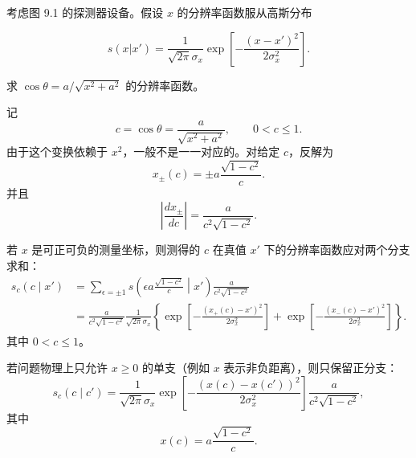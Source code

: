 ﻿





\begin{question}
考虑图 9.1 的探测器设备。假设 \(x\) 的分辨率函数服从高斯分布

\[
s(x|x')=\frac{1}{\sqrt{2\pi}\sigma_x}\exp\left[-\frac{(x-x')^2}{2\sigma_x^2}\right].
\]

求 \(\cos\theta=a/\sqrt{x^2+a^2}\) 的分辨率函数。
\begin{solution}
记
\[
c=\cos\theta=\frac{a}{\sqrt{x^2+a^2}},
\qquad 0<c\le1.
\]
由于这个变换依赖于 \(x^2\)，一般不是一一对应的。对给定 \(c\)，反解为
\[
x_\pm(c)=\pm a\frac{\sqrt{1-c^2}}{c}.
\]
并且
\[
\left|\frac{dx_\pm}{dc}\right|
=\frac{a}{c^2\sqrt{1-c^2}}.
\]

若 \(x\) 是可正可负的测量坐标，则测得的 \(c\) 在真值 \(x'\) 下的分辨率函数应对两个分支求和：
\[
\begin{split}
s_c(c\mid x')
&=\sum_{\epsilon=\pm1}
 s\left(\epsilon a\frac{\sqrt{1-c^2}}{c}\middle|x'\right)
 \frac{a}{c^2\sqrt{1-c^2}}\\
&=\frac{a}{c^2\sqrt{1-c^2}}
\frac{1}{\sqrt{2\pi}\sigma_x}
\left\{
\exp\left[-\frac{(x_+(c)-x')^2}{2\sigma_x^2}\right]
+
\exp\left[-\frac{(x_-(c)-x')^2}{2\sigma_x^2}\right]
\right\}.
\end{split}
\]
其中 \(0<c\le1\)。

若问题物理上只允许 \(x\ge0\) 的单支（例如 \(x\) 表示非负距离），则只保留正分支：
\[
s_c(c\mid c')=
\frac{1}{\sqrt{2\pi}\sigma_x}
\exp\left[-\frac{(x(c)-x(c'))^2}{2\sigma_x^2}\right]
\frac{a}{c^2\sqrt{1-c^2}},
\]
其中
\[
x(c)=a\frac{\sqrt{1-c^2}}{c}.
\]
\end{solution}
\end{question}



